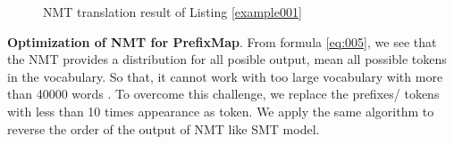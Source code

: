 \begin{figure}
        \caption{NMT translation result of Listing \ref{example001}}
        \label{fig:002} 
\end{figure}

\textbf{Optimization of NMT for PrefixMap}. From formula \ref{eq:005}, we see that the NMT provides a distribution for all posible output, mean all possible tokens in the vocabulary. So that, it cannot work with too large vocabulary with more than 40000 words \cite{028}. To overcome this challenge, we replace the prefixes/ tokens with less than 10 times appearance as  token. We apply the same algorithm to reverse the order of the output of NMT like SMT model.  